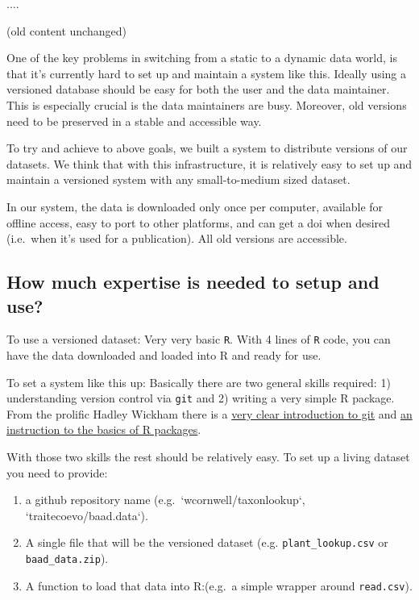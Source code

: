 \documentclass[a4paper,11pt]{article}
\begin{document}
....

(old content unchanged)

One of the key problems in switching from a static to a dynamic data
world, is that it's currently hard to set up and maintain a system like
this. Ideally using a versioned database should be easy for both the
user and the data maintainer. This is especially crucial is the data
maintainers are busy. Moreover, old versions need to be preserved in a
stable and accessible way.

To try and achieve to above goals, we built a system to distribute
versions of our datasets. We think that with this infrastructure, it is
relatively easy to set up and maintain a versioned system with any
small-to-medium sized dataset.

In our system, the data is downloaded only once per computer, available
for offline access, easy to port to other platforms, and can get a doi
when desired (i.e.~when it's used for a publication). All old versions
are accessible.



\subsection{How much expertise is needed to setup and use?}

To use a versioned dataset: Very very basic \texttt{R}. With 4 lines of \texttt{R} code, you can
have the data downloaded and loaded into R and ready for use.

To set a system like this up: Basically there are two general skills required: 1) understanding
version control via \texttt{git} and 2) writing a very simple R package.
From the prolific Hadley Wickham there is a
\href{http://r-pkgs.had.co.nz/git.html}{very clear introduction to git}
and \href{http://r-pkgs.had.co.nz/intro.html}{an instruction to the
basics of R packages}.

With those two skills the rest should be relatively easy. To set up a
living dataset you need to provide:
\begin{enumerate}
  \item a github repository name (e.g.~`wcornwell/taxonlookup`, `traitecoevo/baad.data`).
  \item A single file that will be the versioned dataset (e.g. \texttt{plant\_lookup.csv} or \texttt{baad\_data.zip}).
  \item A function to load that data into R:(e.g.~a simple wrapper around \texttt{read.csv}).
\end{enumerate}
\end{document}
